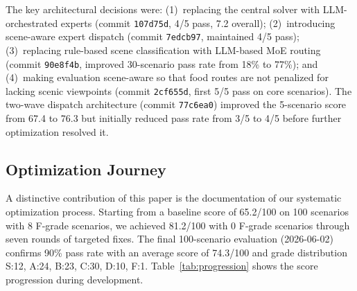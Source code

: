The key architectural decisions were: (1)~replacing the central solver with LLM-orchestrated experts (commit \texttt{107d75d}, 4/5 pass, 7.2 overall); (2)~introducing scene-aware expert dispatch (commit \texttt{7edcb97}, maintained 4/5 pass); (3)~replacing rule-based scene classification with LLM-based MoE routing (commit \texttt{90e8f4b}, improved 30-scenario pass rate from 18\% to 77\%); and (4)~making evaluation scene-aware so that food routes are not penalized for lacking scenic viewpoints (commit \texttt{2cf655d}, first 5/5 pass on core scenarios). The two-wave dispatch architecture (commit \texttt{77c6ea0}) improved the 5-scenario score from 67.4 to 76.3 but initially reduced pass rate from 3/5 to 4/5 before further optimization resolved it.

\subsection{Optimization Journey}
\label{sec:journey}

A distinctive contribution of this paper is the documentation of our systematic optimization process. Starting from a baseline score of 65.2/100 on 100 scenarios with 8 F-grade scenarios, we achieved 81.2/100 with 0 F-grade scenarios through seven rounds of targeted fixes. The final 100-scenario evaluation (2026-06-02) confirms 90\% pass rate with an average score of 74.3/100 and grade distribution S:12, A:24, B:23, C:30, D:10, F:1. Table~\ref{tab:progression} shows the score progression during development.

\begin{table}[!t]
\centering
\caption{Score progression across optimization rounds. All scores from 100-scenario stress tests.}
\label{tab:progression}
\end{table}

